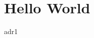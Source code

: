 \documentclass[]{report}
\begin{document}
\iffalse
  \InputIfFileExists{/adl1/adr1.tex}%
  {}
  {Failed}
\fi
\section{Hello World}
{adr1}
\end{document}
